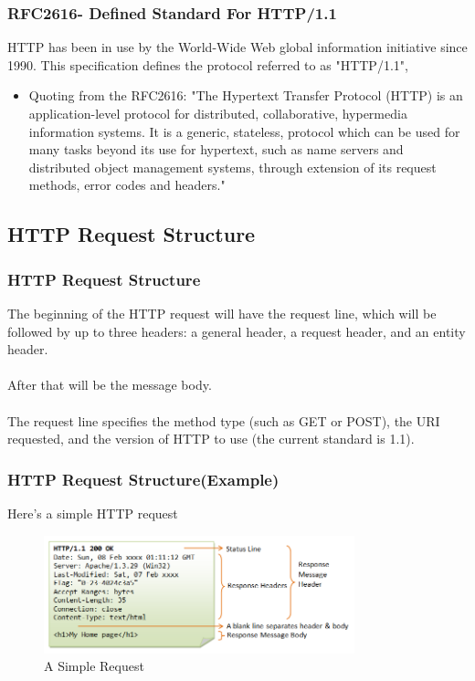 \documentclass{beamer}
\begin{document}
\begin{frame}
\frametitle{RFC2616- Defined Standard For HTTP/1.1}
HTTP has been in use by the World-Wide Web global information initiative since 1990. This specification defines the protocol referred to as "HTTP/1.1",
\begin{itemize}
\item Quoting from the RFC2616: "The Hypertext Transfer Protocol (HTTP) is an application-level protocol for distributed, collaborative, hypermedia information systems. It is a generic, stateless, protocol which can be used for many tasks beyond its use for hypertext, such as name servers and distributed object management systems, through extension of its request methods, error codes and headers."

\end{itemize}
\end{frame}


\subsection{HTTP Request Structure}

\begin{frame}
\frametitle{HTTP Request Structure}
The beginning of the HTTP request will have the request line, which will be followed by up to three headers: a general header, a request header, and an entity header. \\~\\After that will be the message body. \\~\\The request line specifies the method type (such as GET or POST), the URI requested, and the version of HTTP to use (the current standard is 1.1).

\end{frame}


\begin{frame}
\frametitle{HTTP Request Structure(Example)}
Here's a simple HTTP request
\begin{figure}[ht!]
\centering
\includegraphics[width=90mm]{HTTP_Response.png}
\caption{A Simple Request}
\label{overflow}
\end{figure}
\end{frame}
\end{document}
